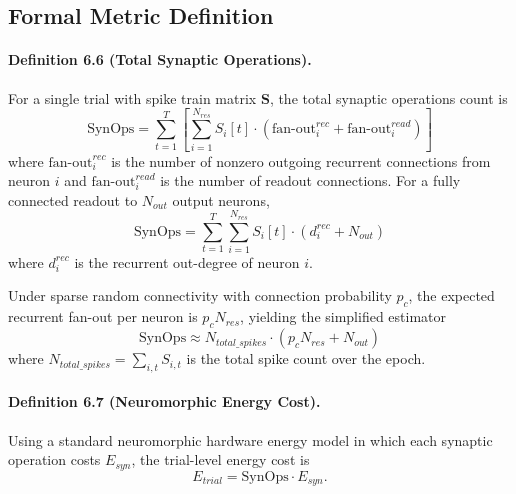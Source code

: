 \subsection{Formal Metric Definition}

\paragraph{Definition 6.6 (Total Synaptic Operations).}
For a single trial with spike train matrix $\mathbf{S}$, the total synaptic operations count is
\begin{equation}
\mathrm{SynOps} = \sum_{t=1}^{T} \left[ \sum_{i=1}^{N_{res}} S_i[t] \cdot \left(\mathrm{fan\mbox{-}out}^{rec}_i + \mathrm{fan\mbox{-}out}^{read}_i\right) \right]
\end{equation}
where $\mathrm{fan\mbox{-}out}^{rec}_i$ is the number of nonzero outgoing recurrent connections from neuron $i$ and $\mathrm{fan\mbox{-}out}^{read}_i$ is the number of readout connections. For a fully connected readout to $N_{out}$ output neurons,
\begin{equation}
\mathrm{SynOps} = \sum_{t=1}^{T} \sum_{i=1}^{N_{res}} S_i[t] \cdot (d_i^{rec}+N_{out})
\end{equation}
where $d_i^{rec}$ is the recurrent out-degree of neuron $i$.

Under sparse random connectivity with connection probability $p_c$, the expected recurrent fan-out per neuron is $p_cN_{res}$, yielding the simplified estimator
\begin{equation}
\mathrm{SynOps} \approx N_{total\_spikes}\cdot (p_cN_{res}+N_{out})
\end{equation}
where $N_{total\_spikes}=\sum_{i,t} S_{i,t}$ is the total spike count over the epoch.

\paragraph{Definition 6.7 (Neuromorphic Energy Cost).}
Using a standard neuromorphic hardware energy model in which each synaptic operation costs $E_{syn}$, the trial-level energy cost is
\begin{equation}
E_{trial}=\mathrm{SynOps}\cdot E_{syn}. 
\end{equation}

